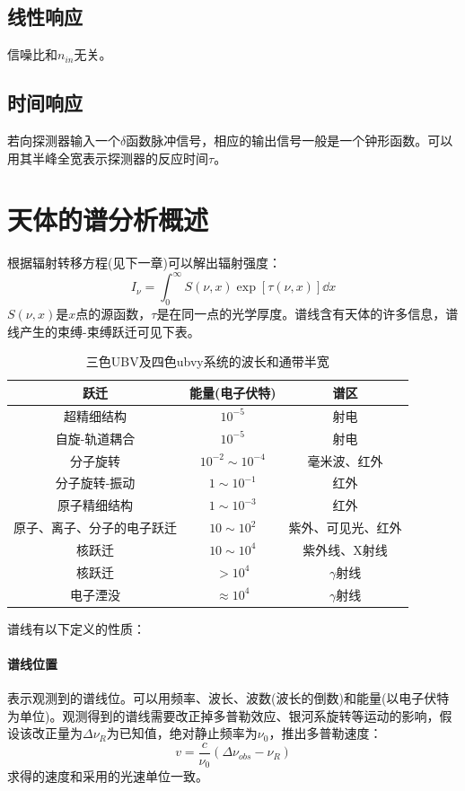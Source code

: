 \subsection{线性响应}信噪比和$n_{in}$无关。
\subsection{时间响应}若向探测器输入一个$\delta$函数脉冲信号，相应的输出信号一般是一个钟形函数。可以用其半峰全宽表示探测器的反应时间$\tau$。
\section{天体的谱分析概述}
根据辐射转移方程(见下一章)可以解出辐射强度：
\begin{equation}
	I_{\nu}=\int_{0}^{\infty}S(\nu,x)\exp[\tau(\nu,x)]\dd x
\end{equation}
$S(\nu,x)$是$x$点的源函数，$\tau$是在同一点的光学厚度。谱线含有天体的许多信息，谱线产生的束缚-束缚跃迁可见下表。
\begin{table}[!htbp]
	\centering
	\caption{三色UBV及四色ubvy系统的波长和通带半宽}
	\begin{tabular}{|c|c|c|}
		\hline
		跃迁&能量(电子伏特)&谱区 \\
		\hline
		超精细结构&$10^{-5}$&射电\\
		\hline 
		自旋-轨道耦合&$10^{-5}$&射电\\
		\hline 
		分子旋转&$10^{-2}\sim10^{-4}$&毫米波、红外\\
		\hline 
		分子旋转-振动&$1\sim 10^{-1}$&红外\\
		\hline 
		原子精细结构&$1\sim10^{-3}$&红外\\
		\hline 
		原子、离子、分子的电子跃迁&$10\sim10^{2}$&紫外、可见光、红外\\
		\hline 
		核跃迁&$10\sim10^{4}$&紫外线、X射线\\
		\hline
		核跃迁&$>10^{4}$&$\gamma$射线\\
		\hline
		电子湮没&$\approx10^4$&$\gamma$射线\\
		\hline
	\end{tabular}
\end{table}
谱线有以下定义的性质：
\paragraph{谱线位置}表示观测到的谱线位。可以用频率、波长、波数(波长的倒数)和能量(以电子伏特为单位)。观测得到的谱线需要改正掉多普勒效应、银河系旋转等运动的影响，假设该改正量为$\Delta\nu_{R}$为已知值，绝对静止频率为$\nu_{0}$，推出多普勒速度：
\begin{equation}
	v=\frac{c}{\nu_{0}}\left(\Delta\nu_{obs}-\nu_{R}\right)
\end{equation}
求得的速度和采用的光速单位一致。
